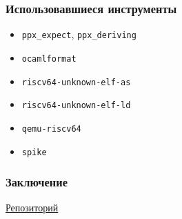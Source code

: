 \documentclass{beamer}
\begin{document}
	\begin{frame}
		\frametitle{Использовавшиеся инструменты}
			\begin{itemize}
				\item \lstinline|ppx_expect|,  \lstinline|ppx_deriving|
				\item \lstinline|ocamlformat|
				\item \lstinline|riscv64-unknown-elf-as|
				\item \lstinline|riscv64-unknown-elf-ld|
				\item \lstinline|qemu-riscv64|
				\item \lstinline|spike|
			\end{itemize}
	\end{frame}

	\begin{frame}
		\frametitle{Заключение}
			\href{https://github.com/psiblvdegod/compiler}{Репозиторий}
	\end{frame}
\end{document}
